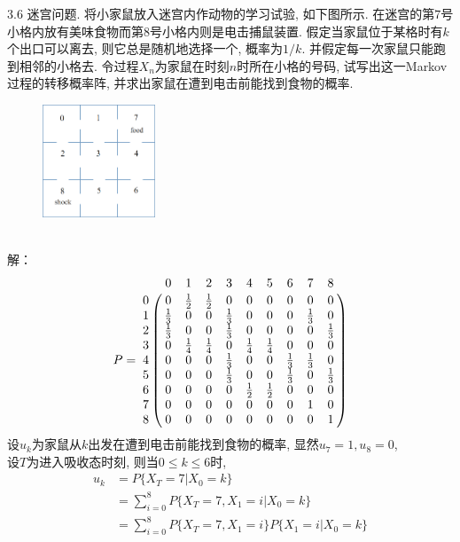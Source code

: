 3.6 迷宫问题. 将小家鼠放入迷宫内作动物的学习试验, 如下图所示. 在迷宫的第$7$号小格内放有美味食物而第$8$号小格内则是电击捕鼠装置. 假定当家鼠位于某格时有$k$个出口可以离去, 则它总是随机地选择一个, 概率为$1/k$. 并假定每一次家鼠只能跑到相邻的小格去. 令过程$X_n$为家鼠在时刻$n$时所在小格的号码, 试写出这一Markov过程的转移概率阵, 并求出家鼠在遭到电击前能找到食物的概率.\\
\begin{figure}[htbp]
	\centering
	\includegraphics[width=0.3\textwidth]{resource/maze.png}
\end{figure}\\
解：\\
\[
P =
\bordermatrix{
	~ & 0 & 1 & 2 & 3 & 4 & 5 & 6 & 7 & 8 \cr
	0 & 0 & \frac{1}{2} & \frac{1}{2} & 0 & 0 & 0 & 0 & 0 & 0 \cr
	1 & \frac{1}{3} & 0 & 0 & \frac{1}{3} & 0 & 0 & 0 & \frac{1}{3} & 0 \cr
	2 & \frac{1}{3} & 0 & 0 & \frac{1}{3} & 0 & 0 & 0 & 0 & \frac{1}{3}\cr
	3 & 0 & \frac{1}{4} & \frac{1}{4} & 0 & \frac{1}{4} & \frac{1}{4} & 0 & 0 & 0 \cr
	4 & 0 & 0 & 0 & \frac{1}{3} & 0 & 0 &\frac{1}{3} & \frac{1}{3} & 0 \cr
	5 & 0 & 0 & 0 & \frac{1}{3} & 0 & 0 &\frac{1}{3} & 0 & \frac{1}{3} \cr
	6 & 0 & 0 & 0 & 0 & \frac{1}{2} & \frac{1}{2} & 0 & 0 & 0 \cr
	7 & 0 & 0 & 0 & 0 & 0 & 0 & 0 & 1 & 0 \cr
	8 & 0 & 0 & 0 & 0 & 0 & 0 & 0 & 0 & 1 \cr
}
\]
设$u_k$为家鼠从$k$出发在遭到电击前能找到食物的概率, 显然$u_7 = 1, u_8 = 0$,\\
设$T$为进入吸收态时刻, 则当$0 \leqslant k \leqslant 6$时,
\begin{align*}
u_k & = P\{X_T = 7 | X_0 = k\}\\
	& = \sum^8_{i=0}P\{X_T = 7, X_1 = i | X_0 = k\}\\
	& = \sum^8_{i=0}P\{X_T = 7, X_1 = i\} P\{X_1 = i | X_0 = k\}
\end{align*}
